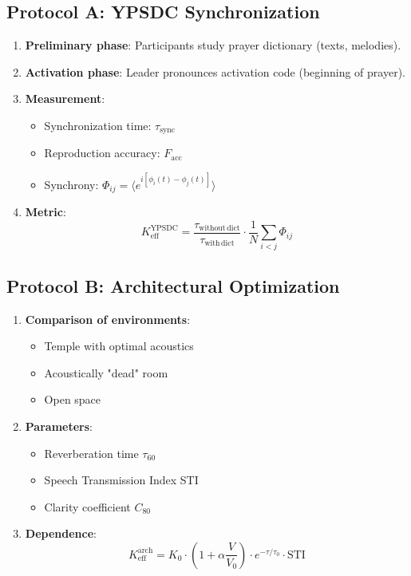 \documentclass[12pt,a4paper]{article}
\begin{document}
	\subsection{Protocol A: YPSDC Synchronization}
	
	\begin{enumerate}
		\item \textbf{Preliminary phase}: Participants study prayer dictionary (texts, melodies).
		\item \textbf{Activation phase}: Leader pronounces activation code (beginning of prayer).
		\item \textbf{Measurement}: 
		\begin{itemize}
			\item Synchronization time: $\tau_{\mathrm{sync}}$
			\item Reproduction accuracy: $F_{\mathrm{acc}}$
			\item Synchrony: $\Phi_{ij} = \langle e^{i[\phi_i(t) - \phi_j(t)]} \rangle$
		\end{itemize}
		\item \textbf{Metric}:
		\[
		K_{\mathrm{eff}}^{\mathrm{YPSDC}} = \frac{\tau_{\mathrm{without\,dict}}}{\tau_{\mathrm{with\,dict}}} \cdot \frac{1}{N} \sum_{i<j} \Phi_{ij}
		\]
	\end{enumerate}
	
	\subsection{Protocol B: Architectural Optimization}
	
	\begin{enumerate}
		\item \textbf{Comparison of environments}:
		\begin{itemize}
			\item Temple with optimal acoustics
			\item Acoustically "dead" room
			\item Open space
		\end{itemize}
		\item \textbf{Parameters}:
		\begin{itemize}
			\item Reverberation time $\tau_{60}$
			\item Speech Transmission Index STI
			\item Clarity coefficient $C_{80}$
		\end{itemize}
		\item \textbf{Dependence}:
		\[
		K_{\mathrm{eff}}^{\mathrm{arch}} = K_0 \cdot \left(1 + \alpha \frac{V}{V_0}\right) \cdot e^{-\tau/\tau_0} \cdot \mathrm{STI}
		\]
	\end{enumerate}
	
\end{document}
